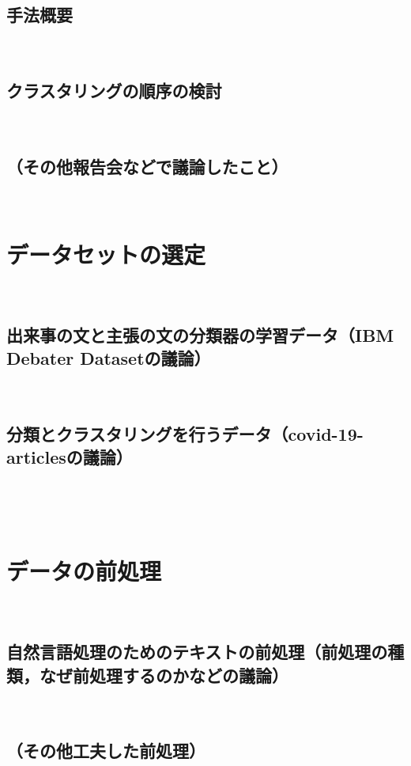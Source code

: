 \documentclass[12pt,a4j]{jreport}
\begin{document}
\subsection{手法概要}
~

\subsection{クラスタリングの順序の検討}
~

\subsection{（その他報告会などで議論したこと）}
~

\section{データセットの選定}
~

\subsection{出来事の文と主張の文の分類器の学習データ（IBM Debater Datasetの議論）}
~

\subsection{分類とクラスタリングを行うデータ（covid-19-articlesの議論）}
~

~

\section{データの前処理}
~

\subsection{自然言語処理のためのテキストの前処理（前処理の種類，なぜ前処理するのかなどの議論）}
~

\subsection{（その他工夫した前処理）}
~
\end{document}
